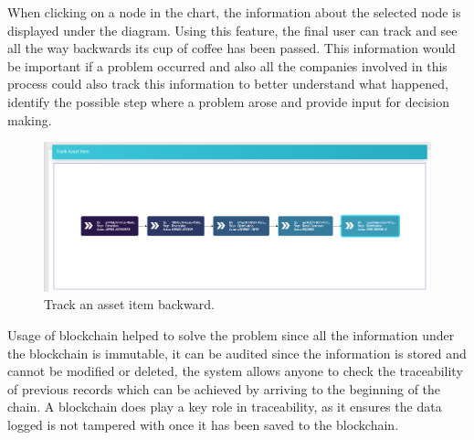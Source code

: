 When clicking on a node in the chart, the information about the selected node is displayed under the diagram. Using this feature, the final user can track and see all the way backwards its cup of coffee has been passed. This information would be important if a problem occurred and also all the companies involved in this process could also track this information to better understand what happened, identify the possible step where a problem arose and provide input for decision making.


\begin{figure}[H]
\begin{center}
  \includegraphics[scale=0.375]{images/use_example/trackbackwards.png}
\caption{Track an asset item backward.}
\label{fig:track_asset_item}
\end{center}
\end{figure}

Usage of blockchain helped to solve the problem since all the information under the blockchain is immutable, it can be audited since the information is stored and cannot be modified or deleted, the system allows anyone to check the traceability of previous records which can be achieved by arriving to the beginning of the chain. A blockchain does play a key role in traceability, as it ensures the data logged is not tampered with once it has been saved to the blockchain. 
 
 
 
 
 